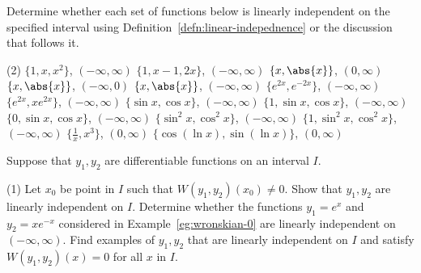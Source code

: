 \begin{Exercise}\label{EX31}
	\vspace{-\baselineskip}%
	\Question\label{3-1-1}%
	Determine whether each set of functions below is linearly independent on the specified interval using Definition~\ref{defn:linear-indepednence} or the discussion that follows it.
	\begin{tasks}(2)
		\task\(\{1, x, x^2\}\), \quad \((-\infty, \infty)\)
		\task\(\{1, x-1, 2x\}\), \quad \((-\infty, \infty)\)
		\task\(\{x, \abs{x}\}\), \quad \((0, \infty)\) 
		\task\(\{x, \abs{x}\}\), \quad \((-\infty,0)\) 
		\task\(\{x, \abs{x}\}\), \quad \((-\infty, \infty)\) 
		\task \(\{e^{2x}, e^{-2x}\}\), \quad \((-\infty, \infty)\)
		\task \(\{e^{2x}, xe^{2x}\}\), \quad \((-\infty, \infty)\)
		\task\(\{\sin x, \cos x\}\), \quad \((-\infty, \infty)\)
		\task\(\{1, \sin x, \cos x\}\), \quad \((-\infty, \infty)\)
		\task\(\{0, \sin x, \cos x\}\), \quad \((-\infty, \infty)\)
		\task\(\{\sin^2 x, \cos^2 x\}\), \quad \((-\infty, \infty)\)
		\task\(\{1, \sin^2 x, \cos^2 x\}\), \quad \((-\infty, \infty)\)
		\task \(\{\frac{1}{x}, x^3\}\), \quad \((0, \infty)\)
		\task \(\{\cos(\ln x), \sin(\ln x)\}\),  \quad \((0, \infty)\)
			
	
	
	\end{tasks}

	
	\Question\label{3-1-2} Suppose that $y_1,y_2$ are differentiable functions on an interval $I.$ 
	\begin{tasks}(1)
		\task	Let $x_0$ be point in $I$ such that 
		$W(y_1, y_2)(x_0)\ne 0.$ Show that \(y_1, y_2\) are linearly independent on $I.$
		\task Determine whether the functions $y_1 = e^x$ and $y_2 = xe^{-x}$ considered in Example~\ref{eg:wronskian-0} are linearly independent on $(-\infty, \infty).$
		\task Find examples of \(y_1, y_2\) that are linearly independent on $I$ and satisfy 
		$W(y_1, y_2)(x)= 0$ for all $x$ in $I.$
	\end{tasks}
\end{Exercise}


